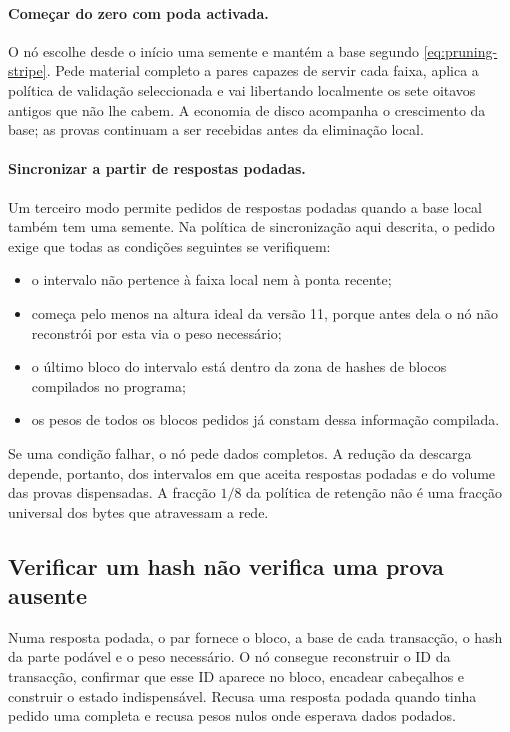 \paragraph{Começar do zero com poda activada.}
O nó escolhe desde o início uma semente e mantém a base segundo
\eqref{eq:pruning-stripe}. Pede material completo a pares capazes de servir
cada faixa, aplica a política de validação seleccionada e vai libertando
localmente os sete oitavos antigos que não lhe cabem. A economia de disco
acompanha o crescimento da base; as provas continuam a ser recebidas antes
da eliminação local.

\paragraph{Sincronizar a partir de respostas podadas.}
%
Um terceiro modo permite pedidos de respostas podadas quando a base local
também tem uma semente. Na política de sincronização aqui descrita, o pedido
exige que todas as condições seguintes se verifiquem:
\begin{itemize}
 \item o intervalo não pertence à faixa local nem à ponta recente;
 \item começa pelo menos na altura ideal da versão 11, porque antes dela o nó
 não reconstrói por esta via o peso necessário;
 \item o último bloco do intervalo está dentro da zona de hashes de blocos
 compilados no programa;
 \item os pesos de todos os blocos pedidos já constam dessa informação
 compilada.
\end{itemize}
Se uma condição falhar, o nó pede dados completos. A redução da descarga
depende, portanto, dos intervalos em que aceita respostas podadas e do volume
das provas dispensadas. A fracção \(1/8\) da política de retenção não é uma
fracção universal dos bytes que atravessam a rede.



\subsection{Verificar um hash não verifica uma prova ausente}
\label{subsec:pruned-sync-validation}

Numa resposta podada, o par fornece o bloco, a base de cada transacção, o hash
da parte podável e o peso necessário. O nó consegue reconstruir o ID da
transacção, confirmar que esse ID aparece no bloco, encadear cabeçalhos e
construir o estado indispensável. Recusa uma resposta podada quando tinha
pedido uma completa e recusa pesos nulos onde esperava dados podados.


